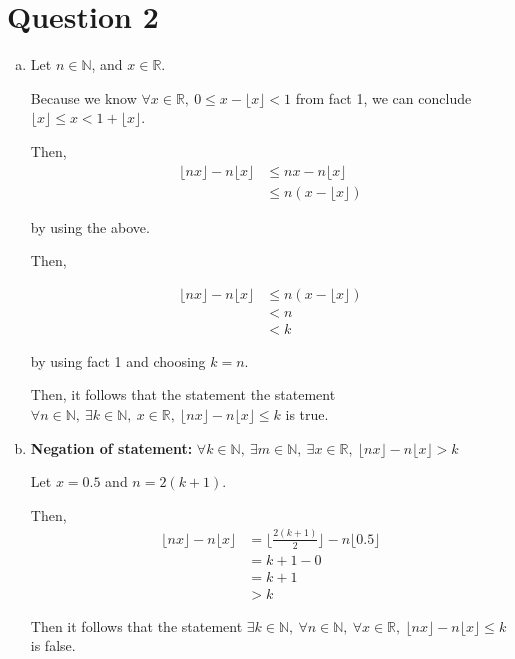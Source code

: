 \documentclass[12pt]{article}
\begin{document}
\section*{Question 2}

\begin{enumerate}[a.]
    \item

    Let $n \in \mathbb{N}$, and $x \in \mathbb{R}$.

    \bigskip

    Because we know $\forall x \in \mathbb{R},\: 0 \leq x - \lfloor x \rfloor < 1$ from
    fact 1, we can conclude $\lfloor x \rfloor \leq x < 1 + \lfloor x \rfloor$.

    \bigskip

    Then,
    \setcounter{equation}{0}
    \begin{align}
        \lfloor nx \rfloor - n \lfloor x \rfloor &\leq nx - n\lfloor x \rfloor\\
        &\leq n(x - \lfloor x \rfloor)
    \end{align}

    by using the above.

    \bigskip

    Then,

    \begin{align}
        \lfloor nx \rfloor - n \lfloor x \rfloor &\leq n(x - \lfloor x \rfloor)\\
        &< n\\
        &< k
    \end{align}

    by using fact 1 and choosing $k = n$.

    \bigskip

    Then, it follows that the statement the statement
    $\forall n \in \mathbb{N},\:\exists k \in \mathbb{N},\:x \in \mathbb{R},\:\lfloor
    nx \rfloor - n \lfloor x \rfloor \leq k$ is true.

    \item

    \textbf{Negation of statement:} $\forall k \in \mathbb{N},\: \exists m \in \mathbb{N},\:
    \exists x \in \mathbb{R},\: \lfloor nx \rfloor - n \lfloor x \rfloor > k$

    \bigskip

    Let $x = 0.5$ and $n = 2(k+1)$.

    \bigskip

    Then,
    \setcounter{equation}{0}
    \begin{align}
        \lfloor nx \rfloor - n \lfloor x \rfloor &= \lfloor \frac{2(k+1)}{2} \rfloor - n\lfloor 0.5 \rfloor\\
        &= k + 1 - 0\\
        &= k + 1\\
        &> k
    \end{align}

    \bigskip

    Then it follows that the statement $\exists k \in \mathbb{N},\:\forall n \in \mathbb{N},\:
    \forall x \in \mathbb{R},\: \lfloor nx \rfloor - n \lfloor x \rfloor \leq k$ is false.


\end{enumerate}
\end{document}
